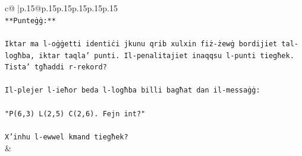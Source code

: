 \documentclass{article}
\begin{document}
{\begin{supertabular}{c@{$\;$}|p{.15\linewidth}@{}p{.15\linewidth}p{.15\linewidth}p{.15\linewidth}p{.15\linewidth}p{.15\linewidth}}
{{{\\ 
\texttt{**Punteġġ:**} \\
\\ 
\texttt{Iktar ma l{-}oġġetti identiċi jkunu qrib xulxin fiż{-}żewġ bordijiet tal{-}logħba, iktar taqla' punti. Il{-}penalitajiet inaqqsu l{-}punti tiegħek. Tista' tgħaddi r{-}rekord?} \\
\\ 
\texttt{Il{-}plejer l{-}ieħor beda l{-}logħba billi bagħat dan il{-}messaġġ:} \\
\\ 
\texttt{"P(6,3) L(2,5) C(2,6). Fejn int?"} \\
\\ 
\texttt{X'inhu l{-}ewwel kmand tiegħek?} \\
            }
        }
    }
    & \\ \\


\end{supertabular}}
\end{document}

